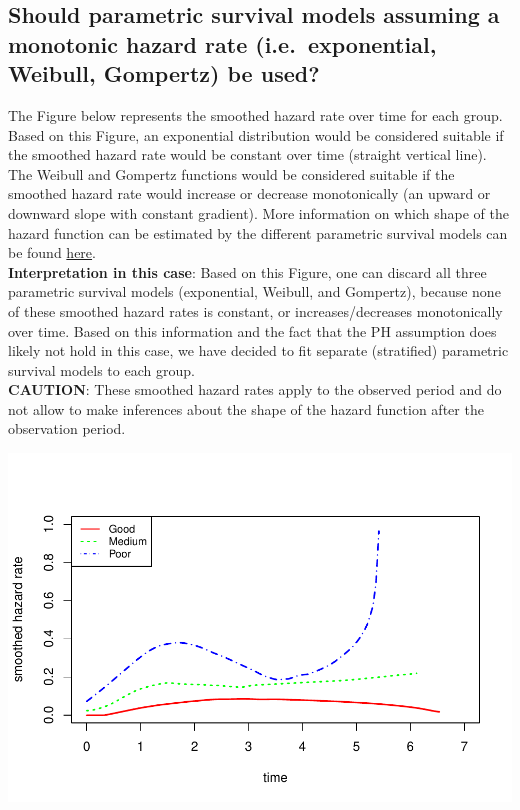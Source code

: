 \documentclass[]{article}
\begin{document}
\subsection{Should parametric survival models assuming a monotonic
hazard rate (i.e.~exponential, Weibull, Gompertz) be
used?}\label{should-parametric-survival-models-assuming-a-monotonic-hazard-rate-i.e.exponential-weibull-gompertz-be-used}

The Figure below represents the smoothed hazard rate over time for each
group. Based on this Figure, an exponential distribution would be
considered suitable if the smoothed hazard rate would be constant over
time (straight vertical line). The Weibull and Gompertz functions would
be considered suitable if the smoothed hazard rate would increase or
decrease monotonically (an upward or downward slope with constant
gradient). More information on which shape of the hazard function can be
estimated by the different parametric survival models can be found
\href{https://devinincerti.com/2019/06/18/parametric_survival.html}{here}.\\
\textbf{Interpretation in this case}: Based on this Figure, one can
discard all three parametric survival models (exponential, Weibull, and
Gompertz), because none of these smoothed hazard rates is constant, or
increases/decreases monotonically over time. Based on this information
and the fact that the PH assumption does likely not hold in this case,
we have decided to fit separate (stratified) parametric survival models
to each group.\\
\textbf{CAUTION}: These smoothed hazard rates apply to the observed
period and do not allow to make inferences about the shape of the hazard
function after the observation period.

\begin{flushleft}\includegraphics{Images/plot_hr-1} \end{flushleft}
\end{document}
